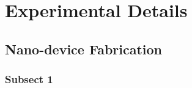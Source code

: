 \chapter{Experimental Details}\label{chap:exp_details}

\section{Nano-device Fabrication}\label{sec:device_fab}
\subsection{Subsect 1}\label{subsec:subsec1}
